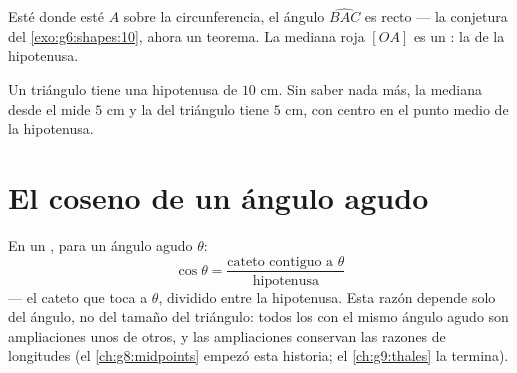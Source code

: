 \begin{omfigure}

{\small Esté donde esté $A$ sobre la circunferencia, el ángulo $\widehat{BAC}$ es
recto --- la conjetura del \cref{exo:g6:shapes:10}, ahora un teorema.
La mediana roja $[OA]$ es un : la  de la hipotenusa.}
\end{omfigure}

\begin{example}\label{ex:g8:cosine:circle}
Un triángulo tiene una hipotenusa de $10$ cm. Sin saber nada
más, la mediana desde el  mide $5$ cm y la
 del triángulo tiene  $5$ cm, con centro en
el punto medio de la hipotenusa.
\end{example}

\section{El coseno de un ángulo agudo}

\begin{definition}[Coseno]\label{def:g8:cosine:def}
En un , para un ángulo agudo $\theta$:
\[
\cos\theta = \frac{\text{cateto contiguo a } \theta}{\text{hipotenusa}}
\]
--- el cateto que toca a $\theta$, dividido entre la hipotenusa. Esta razón
depende solo del ángulo, no del tamaño del triángulo: todos los  con el mismo ángulo agudo son ampliaciones unos de otros,
y las ampliaciones conservan las razones de longitudes
(el \cref{ch:g8:midpoints} empezó esta historia; el \cref{ch:g9:thales}
la termina).
\end{definition}

